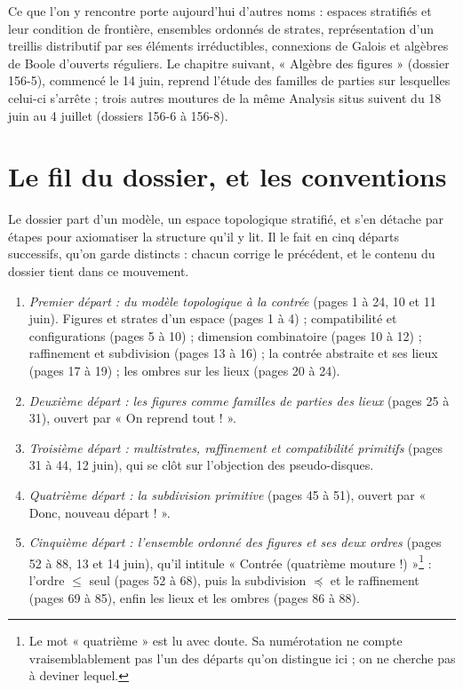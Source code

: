 \documentclass[11pt,a4paper]{article}
\begin{document}
\begin{resume}
Ce que l'on y rencontre porte aujourd'hui d'autres noms : espaces stratifiés et
leur condition de frontière, ensembles ordonnés de strates, représentation d'un
treillis distributif par ses éléments irréductibles, connexions de Galois et
algèbres de Boole d'ouverts réguliers. Le chapitre suivant, « Algèbre des
figures » (dossier 156-5), commencé le 14 juin, reprend l'étude des familles de
parties sur lesquelles celui-ci s'arrête ; trois autres moutures de la même
Analysis situs suivent du 18 juin au 4 juillet (dossiers 156-6 à 156-8).

\end{resume}

\section*{Le fil du dossier, et les conventions}

Le dossier part d'un modèle, un espace topologique stratifié, et s'en
détache par étapes pour axiomatiser la structure qu'il y lit. Il le fait en
cinq départs successifs, qu'on garde distincts : chacun corrige le précédent,
et le contenu du dossier tient dans ce mouvement.

\begin{enumerate}
\item[I.] \emph{Premier départ : du modèle topologique à la contrée} (pages 1
à 24, 10 et 11 juin). Figures et strates d'un espace (pages 1 à 4) ;
compatibilité et configurations (pages 5 à 10) ; dimension combinatoire (pages
10 à 12) ; raffinement et subdivision (pages 13 à 16) ; la contrée abstraite et
ses lieux (pages 17 à 19) ; les ombres sur les lieux (pages 20 à 24).
\item[II.] \emph{Deuxième départ : les figures comme familles de parties des
lieux} (pages 25 à 31), ouvert par « On reprend tout ! ».
\item[III.] \emph{Troisième départ : multistrates, raffinement et compatibilité
primitifs} (pages 31 à 44, 12 juin), qui se clôt sur l'objection des
pseudo-disques.
\item[IV.] \emph{Quatrième départ : la subdivision primitive} (pages 45 à 51),
ouvert par « Donc, nouveau départ ! ».
\item[V.] \emph{Cinquième départ : l'ensemble ordonné des figures et ses deux
ordres} (pages 52 à 88, 13 et 14 juin), qu'il intitule « Contrée (quatrième
mouture !) »\footnote{Le mot « quatrième » est lu avec doute. Sa numérotation
ne compte vraisemblablement pas l'un des départs qu'on distingue ici ; on ne
cherche pas à deviner lequel.} : l'ordre $\leq$ seul (pages 52 à 68), puis la
subdivision $\preccurlyeq$ et le raffinement (pages 69 à 85), enfin les lieux
et les ombres (pages 86 à 88).
\end{enumerate}
\end{document}

